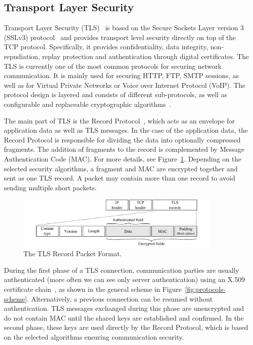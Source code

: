 
\subsection{Transport Layer Security}
Transport Layer Security (TLS)~\cite{rfc5246} is based on the Secure Sockets Layer version 3 (SSLv3) protocol~\cite{rfc6101} and provides transport level security directly on top of the TCP protocol. Specifically, it provides confidentiality, data integrity, non-repudiation, replay protection and authentication through digital certificates. The TLS is currently one of the most common protocols for securing network communication. It is mainly used for securing HTTP, FTP, SMTP sessions, as well as for Virtual Private Networks or Voice over Internet Protocol (VoIP). The protocol design is layered and consists of different sub-protocols, as well as configurable and replaceable cryptographic algorithms~\cite{tls-thesis}.

The main part of TLS is the Record Protocol~\cite{rfc5246}, which acts as an envelope for application data as well as TLS messages. In the case of the application data, the Record Protocol is responsible for dividing the data into optionally compressed fragments. The addition of fragments to the record is complemented by Message Authentication Code (MAC). For more details, see Figure~\ref{fig:tls-record}. Depending on the selected security algorithms, a fragment and MAC are encrypted together and sent as one TLS record. A packet may contain more than one record to avoid sending multiple short packets.

\begin{figure}[!ht]
    \begin{center}
        \includegraphics[width=0.9\textwidth]{figures/paper-encrypted/tls_record}
        \caption{The TLS Record Packet Format.} 
        \label{fig:tls-record}
    \end{center}
\end{figure}

During the first phase of a TLS connection, communication parties are usually authenticated (more often we can see only server authentication) using an X.509 certificate chain~\cite{rfc5280}, as shown in the general scheme in Figure~\ref{fig:protocols-scheme}. Alternatively, a previous connection can be resumed without authentication. TLS messages exchanged during this phase are unencrypted and do not contain MAC until the shared keys are established and confirmed. In the second phase, these keys are used directly by the Record Protocol, which is based on the selected algorithms ensuring communication security.

